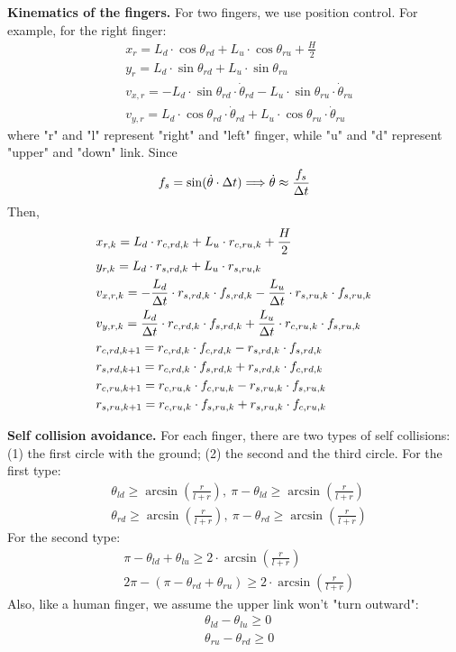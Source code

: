 \textbf{Kinematics of the fingers.}
For two fingers, we use position control. For example, for the right finger:
\begin{align}
    & x_r = L_d \cdot \cos\theta_{rd} + L_u \cdot \cos\theta_{ru} + \frac{H}{2} \\
    & y_r = L_d \cdot \sin\theta_{rd} + L_u \cdot \sin\theta_{ru} \\
    & v_{x,r} = -L_d \cdot \sin\theta_{rd} \cdot \dot{\theta}_{rd} - L_u \cdot \sin\theta_{ru} \cdot \dot{\theta}_{ru} \\
    & v_{y,r} = L_d \cdot \cos\theta_{rd} \cdot \dot{\theta}_{rd} + L_u \cdot \cos\theta_{ru} \cdot \dot{\theta}_{ru}
\end{align}
where "r" and "l" represent "right" and "left" finger, while "u" and "d" represent "upper" and "down" link. Since 
\begin{align}
    \fs = \sin(\dot{\theta} \cdot \dt) \Longrightarrow \dot{\theta} \approx \frac{\fs}{\dt}
\end{align}
Then,
\begin{align}
    & \xr[k] = L_d \cdot \rc[rd,k] + L_u \cdot \rc[ru,k] + \frac{H}{2} \\
    & \yr[k] = L_d \cdot \rs[rd,k] + L_u \cdot \rs[ru,k] \\
    & \vxr[k] = -\frac{L_d}{\dt} \cdot \rs[rd,k] \cdot \fs[rd,k] - \frac{L_u}{\dt} \cdot \rs[ru,k] \cdot \fs[ru,k] \\
    & \vyr[k] = \frac{L_d}{\dt} \cdot \rc[rd,k] \cdot \fs[rd,k] + \frac{L_u}{\dt} \cdot \rc[ru,k] \cdot \fs[ru,k] \\
    & \rc[rd,k+1] = \rc[rd,k] \cdot \fc[rd,k] - \rs[rd,k] \cdot \fs[rd,k] \\
    & \rs[rd,k+1] = \rc[rd,k] \cdot \fs[rd,k] + \rs[rd,k] \cdot \fc[rd,k] \\
    & \rc[ru,k+1] = \rc[ru,k] \cdot \fc[ru,k] - \rs[ru,k] \cdot \fs[ru,k] \\
    & \rs[ru,k+1] = \rc[ru,k] \cdot \fs[ru,k] + \rs[ru,k] \cdot \fc[ru,k]
\end{align}

\textbf{Self collision avoidance.}
For each finger, there are two types of self collisions: (1) the first circle with the ground; (2) the second and the third circle. For the first type:
\begin{align}
    & \theta_{ld} \ge \arcsin(\frac{r}{l+r}), \ \pi - \theta_{ld} \ge \arcsin(\frac{r}{l+r}) \\
    & \theta_{rd} \ge \arcsin(\frac{r}{l+r}), \ \pi - \theta_{rd} \ge \arcsin(\frac{r}{l+r})
\end{align}
For the second type:
\begin{align}
    & \pi - \theta_{ld} + \theta_{lu} \ge 2 \cdot \arcsin(\frac{r}{l+r}) \\
    & 2 \pi - (\pi - \theta_{rd} + \theta_{ru}) \ge 2 \cdot \arcsin(\frac{r}{l+r}) 
\end{align}
Also, like a human finger, we assume the upper link won't "turn outward":
\begin{align}
    & \theta_{ld} - \theta_{lu} \ge 0 \\
    & \theta_{ru} - \theta_{rd} \ge 0 
\end{align}

